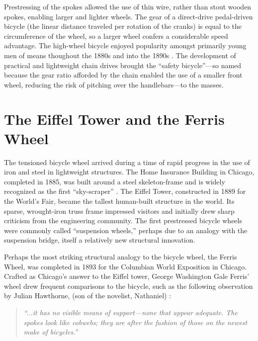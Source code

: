 \documentclass[../thesis.tex]{subfiles}
\begin{document}
Prestressing of the spokes allowed the use of thin wire, rather than stout wooden spokes, enabling larger and lighter wheels. The gear of a direct-drive pedal-driven bicycle (the linear distance traveled per rotation of the cranks) is equal to the circumference of the wheel, so a larger wheel confers a considerable speed advantage. The high-wheel bicycle enjoyed popularity amongst primarily young men of means thoughout the 1880s and into the 1890s \cite{Smith1972}. The development of practical and lightweight chain drives brought the ``safety bicycle''---so named because the gear ratio afforded by the chain enabled the use of a smaller front wheel, reducing the risk of pitching over the handlebars---to the masses.

\section{The Eiffel Tower and the Ferris Wheel}

The tensioned bicycle wheel arrived during a time of rapid progress in the use of iron and steel in lightweight structures. The Home Insurance Building in Chicago, completed in 1885, was built around a steel skeleton-frame and is widely recognized as the first ``sky-scraper'' . The Eiffel Tower, constructed in 1889 for the World's Fair, became the tallest human-built structure in the world. Its sparse, wrought-iron truss frame impressed visitors and initially drew sharp criticism from the engineering community. The first prestressed bicycle wheels were commonly called ``suspension wheels,'' perhaps due to an analogy with the suspension bridge, itself a relatively new structural innovation\cite{Sewall1896}.

Perhaps the most striking structural analogy to the bicycle wheel, the Ferris Wheel, was completed in 1893 for the Columbian World Exposition in Chicago. Crafted as Chicago's answer to the Eiffel tower, George Washington Gale Ferris' wheel drew frequent comparisons to the bicycle, such as the following observation by Julian Hawthorne, (son of the novelist, Nathaniel) \cite{Larson2004}:

\begin{quote}
\emph{``...it has no visible means of support---none that appear adequate. The spokes look like cobwebs; they are after the fashion of those on the newest make of bicycles.''}
\end{quote}
\end{document}
